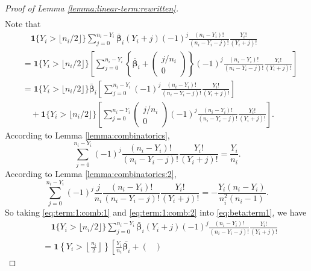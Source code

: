 \documentclass[12pt,letterpaper]{article}
\begin{document}
\begin{proof}[Proof of Lemma \ref{lemma:linear-term:rewritten}]
\begin{equation}
\begin{array}{rl}
\end{array}
\end{equation}
Note that 
\begin{equation}\label{eq:beta:term1}
\begin{array}{rl}
&\displaystyle\quad\mathbf{1}\{Y_i>\lfloor n_i/2\rfloor\}\sum_{j=0}^{n_i-Y_i}\boldsymbol{\bar{\beta}}_i(Y_i+j)(-1)^j\frac{(n_i-Y_i)!}{(n_i-Y_i-j)!}\frac{Y_i!}{(Y_i+j)!}\\
&\displaystyle=\mathbf{1}\{Y_i>\lfloor n_i/2\rfloor\}\left[\sum_{j=0}^{n_i-Y_i}\left\{\boldsymbol{\bar{\beta}}_i+\begin{pmatrix}
j/n_i\\
0
\end{pmatrix}\right\}(-1)^j\frac{(n_i-Y_i)!}{(n_i-Y_i-j)!}\frac{Y_i!}{(Y_i+j)!}\right]\\
&\displaystyle=\mathbf{1}\{Y_i>\lfloor n_i/2\rfloor\}\boldsymbol{\bar{\beta}}_i\left[\sum_{j=0}^{n_i-Y_i}(-1)^j\frac{(n_i-Y_i)!}{(n_i-Y_i-j)!}\frac{Y_i!}{(Y_i+j)!}\right]\\
&\displaystyle\quad+\mathbf{1}\{Y_i>\lfloor n_i/2\rfloor\}\left[\sum_{j=0}^{n_i-Y_i}\begin{pmatrix}
j/n_i\\
0
\end{pmatrix}(-1)^j\frac{(n_i-Y_i)!}{(n_i-Y_i-j)!}\frac{Y_i!}{(Y_i+j)!}\right].
\end{array}
\end{equation}
According to Lemma \ref{lemma:combinatorics}, 
\begin{equation}\label{eq:term:1:comb:1}
\sum_{j=0}^{n_i-Y_i}(-1)^j\frac{(n_i-Y_i)!}{(n_i-Y_i-j)!}\frac{Y_i!}{(Y_i+j)!}=\frac{Y_i}{n_i}.
\end{equation}
According to Lemma \ref{lemma:combinatorics:2}, 
\begin{equation}\label{eq:term:1:comb:2}
\sum_{j=0}^{n_i-Y_i}(-1)^j\frac{j}{n_i}\frac{(n_i-Y_i)!}{(n_i-Y_i-j)!}\frac{Y_i!}{(Y_i+j)!}=-\frac{Y_i(n_i-Y_i)}{n_i^2(n_i-1)}.
\end{equation}
So taking \eqref{eq:term:1:comb:1} and \eqref{eq:term:1:comb:2} into \eqref{eq:beta:term1}, we have 
\begin{equation}\label{eq:term:1:new}
\begin{array}{rl}
&\displaystyle\quad\mathbf{1}\{Y_i>\lfloor n_i/2\rfloor\}\sum_{j=0}^{n_i-Y_i}\boldsymbol{\bar{\beta}}_i(Y_i+j)(-1)^j\frac{(n_i-Y_i)!}{(n_i-Y_i-j)!}\frac{Y_i!}{(Y_i+j)!}\\
&\displaystyle=\mathbf{1}\left\{Y_i>\left\lfloor\frac{n_i}{2}\right\rfloor\right\}\left[\frac{Y_i}{n_i}\bar{\boldsymbol{\beta}_i}+\begin{pmatrix}

\end{pmatrix}
\end{array}
\end{equation}
\end{proof}
\end{document}
